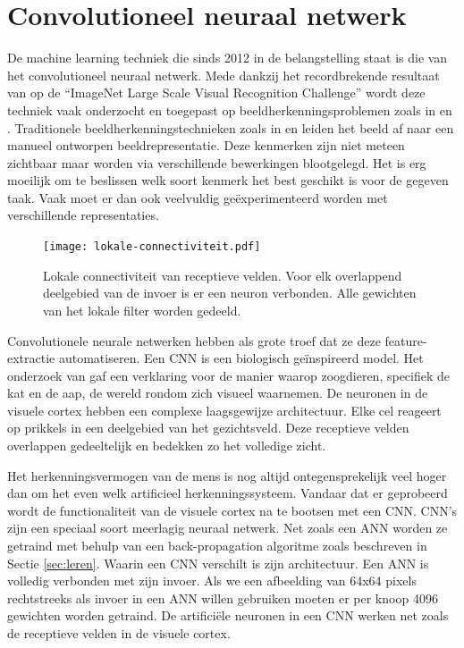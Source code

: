 \section{Convolutioneel neuraal netwerk}
De machine learning techniek die sinds 2012 in de belangstelling staat is die van het convolutioneel neuraal netwerk. Mede dankzij het recordbrekende resultaat van \cite{cnn-krizhevsky} op de ``ImageNet Large Scale Visual Recognition Challenge'' wordt deze techniek vaak onderzocht en toegepast op beeldherkenningsproblemen zoals in \cite{cnn-ji} en \cite{cnn-karpathy}.
\npar Traditionele beeldherkenningstechnieken zoals in \cite{perronnin2010improving} en \cite{jhuang2007biologically} leiden het beeld af naar een manueel ontworpen beeldrepresentatie. Deze kenmerken zijn niet meteen zichtbaar maar worden via verschillende bewerkingen blootgelegd. Het is erg moeilijk om te beslissen welk soort kenmerk het best geschikt is voor de gegeven taak. Vaak moet er dan ook veelvuldig ge\"experimenteerd worden met verschillende representaties.
\begin{figure}[!t]
	\centering
	\texttt{[image: lokale-connectiviteit.pdf]}
	\caption{Lokale connectiviteit van receptieve velden. Voor elk overlappend deelgebied van de invoer is er een neuron verbonden. Alle gewichten van het lokale filter worden gedeeld.}
	\label{fig:lokale-connectiviteit}
\end{figure}
\npar Convolutionele neurale netwerken hebben als grote troef dat ze deze feature-extractie automatiseren. Een CNN is een biologisch ge\"inspireerd model. Het onderzoek van \cite{hubel1968receptive} gaf een verklaring voor de manier waarop zoogdieren, specifiek de kat en de aap, de wereld rondom zich visueel waarnemen. De neuronen in de visuele cortex hebben een complexe laagsgewijze architectuur. Elke cel reageert op prikkels in een deelgebied van het gezichtsveld. Deze receptieve velden overlappen gedeeltelijk en bedekken zo het volledige zicht.

\npar Het herkenningsvermogen van de mens is nog altijd ontegensprekelijk veel hoger dan om het even welk artificieel herkenningssysteem. Vandaar dat er geprobeerd wordt de functionaliteit van de visuele cortex na te bootsen met een CNN. 
\npar CNN's zijn een speciaal soort meerlagig neuraal netwerk. Net zoals een ANN worden ze getraind met behulp van een back-propagation algoritme zoals beschreven in Sectie \ref{sec:leren}. Waarin een CNN verschilt is zijn architectuur. Een ANN is volledig verbonden met zijn invoer. Als we een afbeelding van 64x64 pixels rechtstreeks als invoer in een ANN willen gebruiken moeten er per knoop 4096 gewichten worden getraind. De artifici\"ele neuronen in een CNN werken net zoals de receptieve velden in de visuele cortex.

